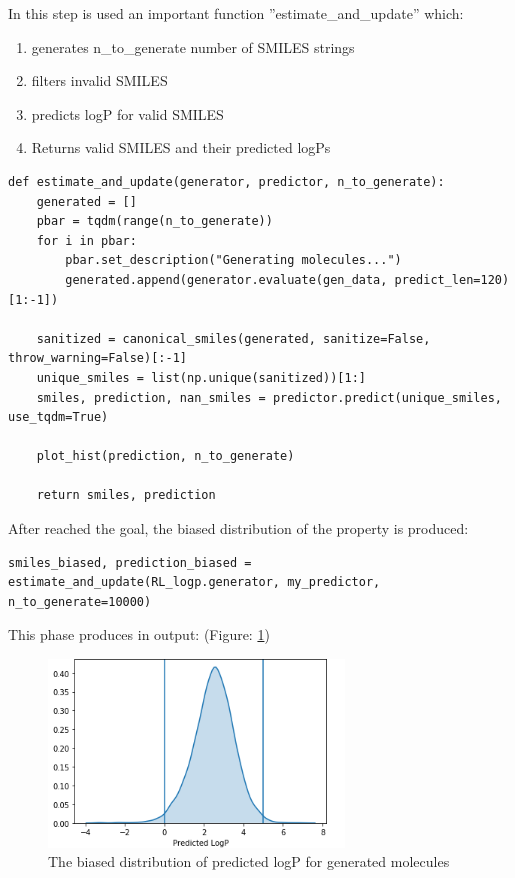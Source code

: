 \documentclass[a4paper]{article}
\begin{document}
In this step is used an important function ''estimate\_and\_update'' which:
\begin{enumerate}
	\item generates n\_to\_generate number of SMILES strings
	\item filters invalid SMILES
	\item predicts logP for valid SMILES
	\item Returns valid SMILES and their predicted logPs
\end{enumerate}

\begin{lstlisting}
def estimate_and_update(generator, predictor, n_to_generate):
    generated = []
    pbar = tqdm(range(n_to_generate))
    for i in pbar:
        pbar.set_description("Generating molecules...")
        generated.append(generator.evaluate(gen_data, predict_len=120)[1:-1])

    sanitized = canonical_smiles(generated, sanitize=False, throw_warning=False)[:-1]
    unique_smiles = list(np.unique(sanitized))[1:]
    smiles, prediction, nan_smiles = predictor.predict(unique_smiles, use_tqdm=True)  
                                                       
    plot_hist(prediction, n_to_generate)
        
    return smiles, prediction
\end{lstlisting}

After reached the goal, the biased distribution of the property is produced:

\begin{lstlisting}
smiles_biased, prediction_biased = estimate_and_update(RL_logp.generator, my_predictor, n_to_generate=10000)
\end{lstlisting}

This phase produces in output: (Figure: \ref{fig:biased})

\begin{figure}[htbp]
	\centering
		\includegraphics[width=0.70\textwidth]{biased.png}
			\caption{The biased distribution of predicted logP for generated molecules}
	\label{fig:biased}
\end{figure}
\end{document}
